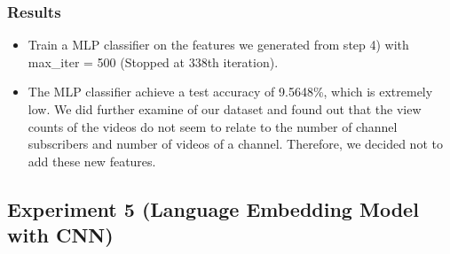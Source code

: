 \documentclass[english]{article}
\begin{document}
\subsubsection{Results}
    \begin{itemize}
    \item Train a MLP classifier on the features we generated from step 4) with max\_iter = 500 (Stopped at 338th iteration).
    \item The MLP classifier achieve a test accuracy of 9.5648\%, which is extremely low. We did further examine of our dataset and found out that the view counts of the videos do not seem to relate to the number of channel subscribers and number of videos of a channel. Therefore, we decided not to add these new features.
\end{itemize}


\subsection{Experiment 5 (Language Embedding Model with CNN)}
\end{document}
